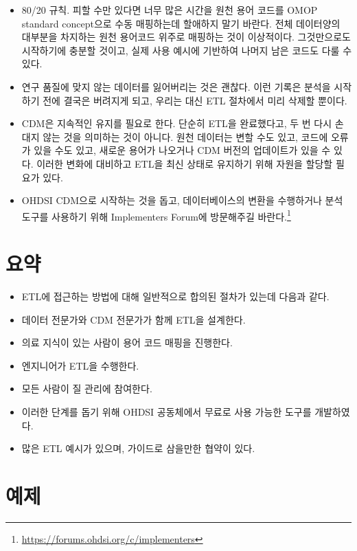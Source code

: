 \documentclass[10.5pt]{book}
\providecommand{\tightlist}{%
  \setlength{\itemsep}{0pt}\setlength{\parskip}{0pt}}
\let\rmarkdownfootnote\footnote%
\def\footnote{\protect\rmarkdownfootnote}
\theoremstyle{definition}
\theoremstyle{definition}
\theoremstyle{definition}
\theoremstyle{remark}
\let\BeginKnitrBlock\begin \let\EndKnitrBlock\end
\begin{document}
\begin{itemize}
\tightlist
\item
  80/20 규칙. 피할 수만 있다면 너무 많은 시간을 원천 용어 코드를 OMOP
  standard concept으로 수동 매핑하는데 할애하지 말기 바란다. 전체
  데이터양의 대부분을 차지하는 원천 용어코드 위주로 매핑하는 것이
  이상적이다. 그것만으로도 시작하기에 충분할 것이고, 실제 사용 예시에
  기반하여 나머지 남은 코드도 다룰 수 있다.
\item
  연구 품질에 맞지 않는 데이터를 잃어버리는 것은 괜찮다. 이런 기록은
  분석을 시작하기 전에 결국은 버려지게 되고, 우리는 대신 ETL 절차에서
  미리 삭제할 뿐이다.
\item
  CDM은 지속적인 유지를 필요로 한다. 단순히 ETL을 완료했다고, 두 번 다시
  손대지 않는 것을 의미하는 것이 아니다. 원천 데이터는 변할 수도 있고,
  코드에 오류가 있을 수도 있고, 새로운 용어가 나오거나 CDM 버전의
  업데이트가 있을 수 있다. 이러한 변화에 대비하고 ETL을 최신 상태로
  유지하기 위해 자원을 할당할 필요가 있다.
\item
  OHDSI CDM으로 시작하는 것을 돕고, 데이터베이스의 변환을 수행하거나
  분석 도구를 사용하기 위해 Implementers Forum에 방문해주길
  바란다.\footnote{\url{https://forums.ohdsi.org/c/implementers}}
\end{itemize}

\section{요약}\label{-4}

\BeginKnitrBlock{rmdsummary}
\begin{itemize}
\item
  ETL에 접근하는 방법에 대해 일반적으로 합의된 절차가 있는데 다음과
  같다.
\item
  데이터 전문가와 CDM 전문가가 함께 ETL을 설계한다.
\item
  의료 지식이 있는 사람이 용어 코드 매핑을 진행한다.
\item
  엔지니어가 ETL을 수행한다.
\item
  모든 사람이 질 관리에 참여한다.
\item
  이러한 단계를 돕기 위해 OHDSI 공동체에서 무료로 사용 가능한 도구를
  개발하였다.
\item
  많은 ETL 예시가 있으며, 가이드로 삼을만한 협약이 있다.
\end{itemize}
\EndKnitrBlock{rmdsummary}

\section{예제}\label{-2}
\end{document}
